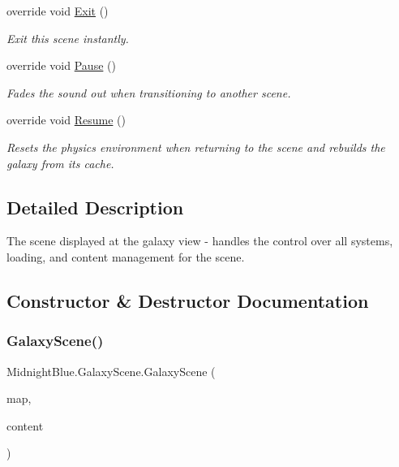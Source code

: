 \begin{DoxyCompactItemize}
override void \hyperlink{class_midnight_blue_1_1_galaxy_scene_a7a96978e050da997330bcc0f3cd00f9e}{Exit} ()
\begin{DoxyCompactList}\small\item\em Exit this scene instantly. \end{DoxyCompactList}\item 
override void \hyperlink{class_midnight_blue_1_1_galaxy_scene_aeb44afaeda2cccd225e64908bb76bee4}{Pause} ()
\begin{DoxyCompactList}\small\item\em Fades the sound out when transitioning to another scene. \end{DoxyCompactList}\item 
override void \hyperlink{class_midnight_blue_1_1_galaxy_scene_ab641e6727cdb64dc6487e9a229521692}{Resume} ()
\begin{DoxyCompactList}\small\item\em Resets the physics environment when returning to the scene and rebuilds the galaxy from its cache. \end{DoxyCompactList}\end{DoxyCompactItemize}


\subsection{Detailed Description}
The scene displayed at the galaxy view -\/ handles the control over all systems, loading, and content management for the scene. 



\subsection{Constructor \& Destructor Documentation}
\hypertarget{class_midnight_blue_1_1_galaxy_scene_acdd82e3464ea18ca77bcf4694e9803a5}{}\label{class_midnight_blue_1_1_galaxy_scene_acdd82e3464ea18ca77bcf4694e9803a5} 
\subsubsection{\texorpdfstring{Galaxy\+Scene()}{GalaxyScene()}}
{\footnotesize\ttfamily Midnight\+Blue.\+Galaxy\+Scene.\+Galaxy\+Scene (\begin{DoxyParamCaption}\item[{Entity\+Map}]{map,  }\item[{Content\+Manager}]{content }\end{DoxyParamCaption})\hspace{0.3cm}{\ttfamily [inline]}}



